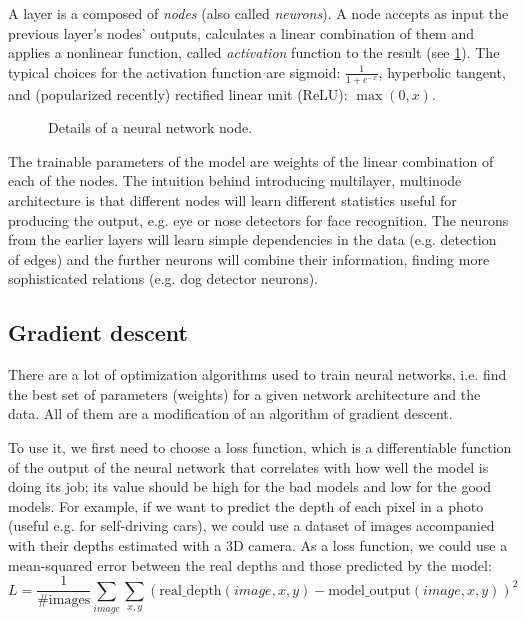 A layer is a composed of \emph{nodes} (also called \emph{neurons}). A node accepts as input the previous layer's nodes' outputs, calculates a linear combination of them and applies a nonlinear function, called \emph{activation} function to the result (see \ref{ann-nodes}). The typical choices for the activation function are sigmoid: $\frac{1}{1 + e^{-x}}$, hyperbolic tangent, and (popularized recently) rectified linear unit (ReLU): $\max(0, x)$. 
\begin{figure}[h]
  \centering
  \resizebox{0.7\textwidth}{!}{
  
}
  \caption{Details of a neural network node.} \label{ann-nodes}
\end{figure}

The trainable parameters of the model are weights of the linear combination of each of the nodes. The intuition behind introducing multilayer, multinode architecture is that different nodes will learn different statistics useful for producing the output, e.g. eye or nose detectors for face recognition. The neurons from the earlier layers will learn simple dependencies in the data (e.g. detection of edges) and the further neurons will combine their information, finding more sophisticated relations (e.g. dog detector neurons).

\subsection{Gradient descent}\label{gradient descent}
There are a lot of optimization algorithms used to train neural networks, i.e. find the best set of parameters (weights) for a given network architecture and the data. All of them are a modification of an algorithm of gradient descent. 

To use it, we first need to choose a loss function, which is a differentiable function of the output of the neural network that correlates with how well the model is doing its job; its value should be high for the bad models and low for the good  models. For example, if we want to predict the depth of each pixel in a photo (useful e.g. for self-driving cars), we could use a dataset of images accompanied with their depths estimated with a 3D camera. As a loss function, we could use a mean-squared error between the real depths and those predicted by the model:
$$
L = \frac{1}{\mbox{\# images}}\sum_{image} \sum_{x, y} (\mbox{real\_depth}(image, x, y) - \mbox{model\_output}(image, x, y))^2
$$


